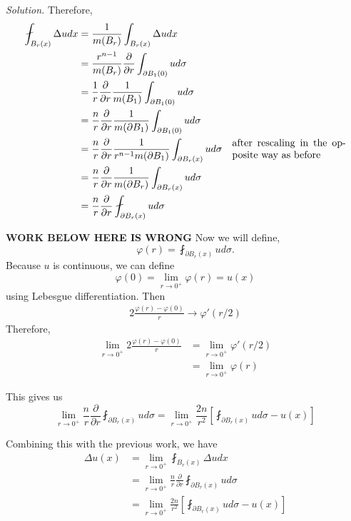 \documentclass[a4paper]{article}
\newenvironment{solution}{\emph{Solution.}}{}
\begin{document}
\begin{enumerate}
\begin{solution}
      Therefore,
      \begin{align*}
        \fint_{B_r(x)}^{} \Delta u dx
        &=\frac{1}{m(B_r)} \int_{B_r(x)}^{} \Delta u dx \\
        &= \frac{r^{n-1}}{m(B_r)} \frac{\partial}{\partial r} \int_{\partial B_1(0)}^{} u d\sigma \\
        &= \frac{1}{r} \frac{\partial}{\partial r} \frac{1}{m(B_1)} \int_{\partial B_1(0)}^{} u d\sigma \\
        &= \frac{n}{r} \frac{\partial}{\partial r} \frac{1}{m(\partial B_1)} \int_{\partial B_1(0)}^{} u d\sigma \\
        &= \frac{n}{r} \frac{\partial}{\partial r} \frac{1}{r^{n-1} m(\partial B_1)} \int_{\partial B_r(x)}^{} u d\sigma \quad \parbox{4cm}{after
        rescaling in the opposite way as before} \\
        &= \frac{n}{r} \frac{\partial}{\partial r} \frac{1}{m(\partial B_r)} \int_{\partial B_r(x)}^{} u d\sigma \\
        &= \frac{n}{r} \frac{\partial}{\partial r} \fint_{\partial B_r(x)}^{} u d\sigma
      \end{align*}

      \textbf{WORK BELOW HERE IS WRONG}
      Now we will define,
      \[ \varphi(r) = \fint_{\partial B_r(x)}^{} u d \sigma .\]
      Because $u$ is continuous, we can define
      \[ \varphi(0) = \lim_{r \to 0^+} \varphi(r) = u(x) \]
      using Lebesgue differentiation. Then
      \begin{align*}
        2 \frac{\varphi(r) - \varphi(0)}{r} \to \varphi'(r/2)
      \end{align*}
      Therefore,
      \begin{align*}
        \lim_{r \to 0^+} 2 \frac{\varphi(r) - \varphi(0)}{r} &= \lim_{r \to 0^+} \varphi'(r/2) \\
        &= \lim_{r \to 0^+} \varphi(r)
      \end{align*}

      This gives us
      \[ \lim_{r \to 0^+} \frac{n}{r} \frac{\partial}{\partial r} \fint_{\partial B_r(x)}^{} u d \sigma = \lim_{r \to 0^+} \frac{2n}{r^2} \left[ \fint_{\partial B_r(x)}^{} u
      d\sigma - u(x) \right] \]

      Combining this with the previous work, we have
      \begin{align*}
        \Delta u(x) &= \lim_{r \to 0^+} \fint_{B_r(x)}^{} \Delta u dx \\
        &= \lim_{r \to 0^+} \frac{n}{r} \frac{\partial}{\partial r} \fint_{\partial B_r(x)}^{} u d \sigma \\
        &= \lim_{r \to 0^+} \frac{2n}{r^2} \left[ \fint_{\partial B_r(x)}^{} u d\sigma - u(x) \right]
      \end{align*}


\end{solution}
\end{enumerate}
\end{document}
